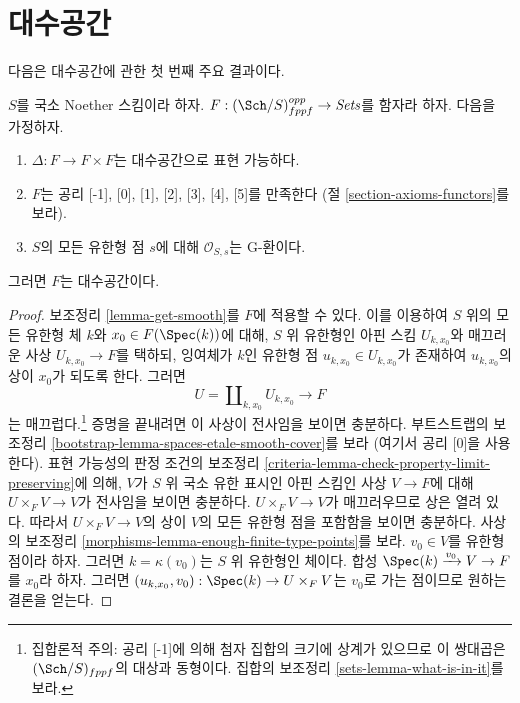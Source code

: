 \section{대수공간}
\label{section-algebraic-spaces}

\noindent
다음은 대수공간에 관한 첫 번째 주요 결과이다.

\begin{proposition}
\label{proposition-spaces-diagonal-representable}
$S$를 국소 Noether 스킴이라 하자.
$F : (\Sch/S)_{fppf}^{opp} \to \textit{Sets}$를 함자라 하자. 다음을 가정하자.
\begin{enumerate}
\item $\Delta : F \to F \times F$는 대수공간으로 표현 가능하다.
\item $F$는 공리 [-1], [0], [1], [2], [3], [4], [5]를 만족한다
(절 \ref{section-axioms-functors}를 보라).
\item $S$의 모든 유한형 점 $s$에 대해 $\mathcal{O}_{S, s}$는 G-환이다.
\end{enumerate}
그러면 $F$는 대수공간이다.
\end{proposition}

\begin{proof}
보조정리 \ref{lemma-get-smooth}를 $F$에 적용할 수 있다. 이를 이용하여
$S$ 위의 모든 유한형 체 $k$와 $x_0 \in F(\Spec(k))$에 대해,
$S$ 위 유한형인 아핀 스킴 $U_{k, x_0}$와 매끄러운 사상
$U_{k, x_0} \to F$를 택하되, 잉여체가 $k$인 유한형 점
$u_{k, x_0} \in U_{k, x_0}$가 존재하여 $u_{k, x_0}$의 상이 $x_0$가
되도록 한다. 그러면
$$
U = \coprod\nolimits_{k, x_0} U_{k, x_0} \longrightarrow F
$$
는 매끄럽다.\footnote{집합론적 주의: 공리 [-1]에 의해 첨자 집합의
크기에 상계가 있으므로 이 쌍대곱은 $(\Sch/S)_{fppf}$의 대상과
동형이다. 집합의 보조정리 \ref{sets-lemma-what-is-in-it}를 보라.}
증명을 끝내려면 이 사상이 전사임을 보이면 충분하다.
부트스트랩의 보조정리 \ref{bootstrap-lemma-spaces-etale-smooth-cover}를
보라 (여기서 공리 [0]을 사용한다). 표현 가능성의 판정 조건의
보조정리 \ref{criteria-lemma-check-property-limit-preserving}에 의해,
$V$가 $S$ 위 국소 유한 표시인 아핀 스킴인 사상 $V \to F$에 대해
$U \times_F V \to V$가 전사임을 보이면 충분하다.
$U \times_F V \to V$가 매끄러우므로 상은 열려 있다. 따라서
$U \times_F V \to V$의 상이 $V$의 모든 유한형 점을 포함함을 보이면
충분하다. 사상의 보조정리 \ref{morphisms-lemma-enough-finite-type-points}를
보라. $v_0 \in V$를 유한형 점이라 하자. 그러면 $k = \kappa(v_0)$는
$S$ 위 유한형인 체이다.
합성 $\Spec(k) \xrightarrow{v_0} V \to F$를 $x_0$라 하자. 그러면
$(u_{k, x_0}, v_0) : \Spec(k) \to U \times_F V$는 $v_0$로 가는 점이므로
원하는 결론을 얻는다.
\end{proof}

